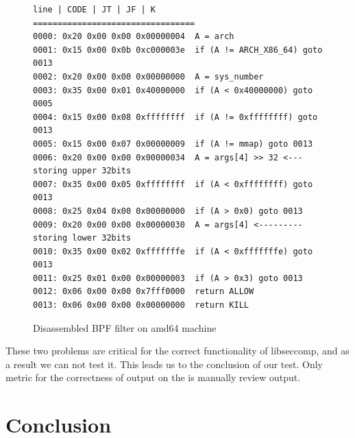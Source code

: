 \begin{figure}[h]
	\label{BPF_rule}
	\lstset{style=npl}
	\begin{lstlisting}
line | CODE | JT | JF | K
=================================
0000: 0x20 0x00 0x00 0x00000004  A = arch
0001: 0x15 0x00 0x0b 0xc000003e  if (A != ARCH_X86_64) goto 0013
0002: 0x20 0x00 0x00 0x00000000  A = sys_number
0003: 0x35 0x00 0x01 0x40000000  if (A < 0x40000000) goto 0005
0004: 0x15 0x00 0x08 0xffffffff  if (A != 0xffffffff) goto 0013
0005: 0x15 0x00 0x07 0x00000009  if (A != mmap) goto 0013
0006: 0x20 0x00 0x00 0x00000034  A = args[4] >> 32 <--- storing upper 32bits
0007: 0x35 0x00 0x05 0xffffffff  if (A < 0xffffffff) goto 0013
0008: 0x25 0x04 0x00 0x00000000  if (A > 0x0) goto 0013
0009: 0x20 0x00 0x00 0x00000030  A = args[4] <--------- storing lower 32bits
0010: 0x35 0x00 0x02 0xfffffffe  if (A < 0xfffffffe) goto 0013
0011: 0x25 0x01 0x00 0x00000003  if (A > 0x3) goto 0013
0012: 0x06 0x00 0x00 0x7fff0000  return ALLOW
0013: 0x06 0x00 0x00 0x00000000  return KILL
	\end{lstlisting}
	\caption{Disassembled BPF filter on amd64 machine}
\end{figure}

These two problems are critical for the correct functionality of libseccomp, and
as a result we can not test it. This leads us to the conclusion of our test. Only
metric for the correctness of output on the is manually review output.

\chapter{Conclusion}




